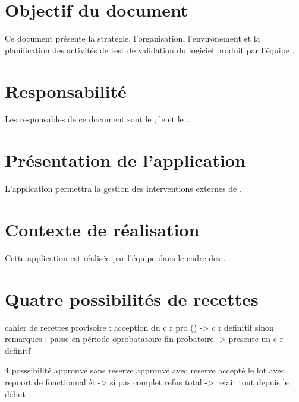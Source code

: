 \section{Objectif du document}
	Ce document présente la stratégie, l'organisation, l'environement et la planification des activités de test de validation du logiciel produit par l'équipe \nomClient.
	
\section{Responsabilité}
	Les responsables de ce document sont le \CP, le \RQ{} et le \RD.
	
\section{Présentation de l'application}
	L'application permettra la gestion des interventions externes de \nomClient.
	
\section{Contexte de réalisation}
	Cette application est réalisée par l'équipe \nomEquipe dans le cadre des \PIC.

\section{Quatre possibilités de recettes}
	cahier de recettes provisoire :
		acception du c r pro  () -> c r definitif
	sinon
		remarques : passe en période oprobatatoire
		fin probatoire -> presente un c r definitf
		
		4 posssibilité
			approuvé sans reserve
			approuvé avec reserve
			accepté le lot avec repoort de fonctionnaliét
				-> si pas complet
			refus total
				-> refait tout depuis le début